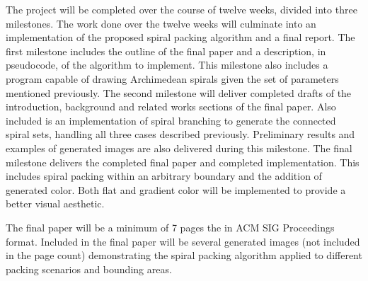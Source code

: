 \documentclass[11pt]{article}
\begin{document}
	The project will be completed over the course of twelve weeks, divided into three milestones. The work done over the twelve weeks will culminate into an implementation of the proposed spiral packing algorithm and a final report. The first milestone includes the outline of the final paper and a description, in pseudocode, of the algorithm to implement. This milestone also includes a program capable of drawing Archimedean spirals given the set of parameters mentioned previously. The second milestone will deliver completed drafts of the introduction, background and related works sections of the final paper. Also included is an implementation of spiral branching to generate the connected spiral sets, handling all three cases described previously. Preliminary results and examples of generated images are also delivered during this milestone. The final milestone delivers the completed final paper and completed implementation. This includes spiral packing within an arbitrary boundary and the addition of generated color. Both flat and gradient color will be implemented to provide a better visual aesthetic.

	The final paper will be a minimum of 7 pages the in ACM SIG Proceedings format. Included in the final paper will be several generated images (not included in the page count) demonstrating the spiral packing algorithm applied to different packing scenarios and bounding areas.
	
\begingroup
\renewcommand{\section}[2]{}%

{}
\endgroup
\end{document}
